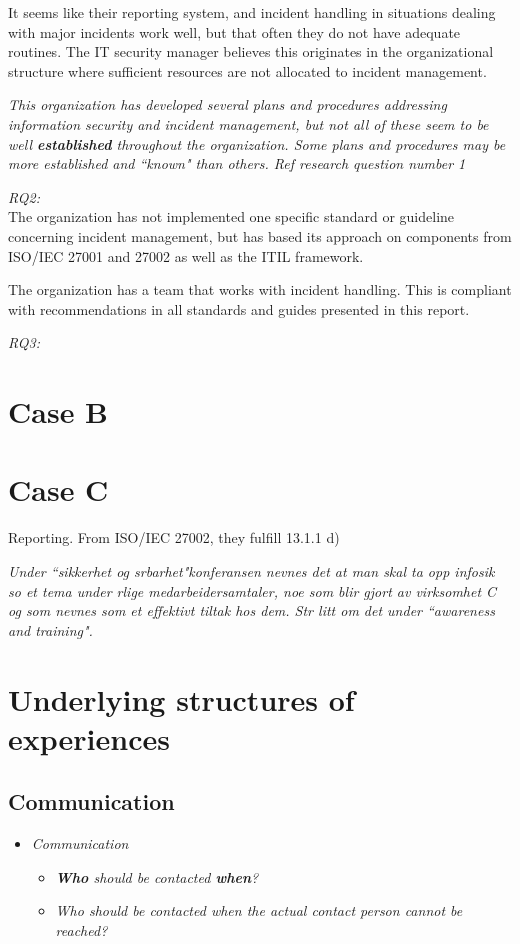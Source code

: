 It seems like their reporting system, and incident handling in situations dealing with major incidents work well, but that often they do not have adequate routines. The IT security manager believes this originates in the organizational structure where sufficient resources are not allocated to incident management. 

\textit{This organization has developed several plans and procedures addressing information security and incident management, but not all of these seem to be well \textbf{established} throughout the organization. Some plans and procedures may be more established and ``known" than others. Ref research question number 1}

\textit{RQ2:}\\
The organization has not implemented one specific standard or guideline concerning incident management, but has based its approach on components from ISO/IEC 27001 and 27002 as well as the \ac{ITIL} framework. 

The organization has a team that works with incident handling. This is compliant with recommendations in all standards and guides presented in this report.

\textit{RQ3:}\\

\section{Case B}

\section{Case C}

Reporting. From ISO/IEC 27002, they fulfill 13.1.1 d)

\textit{Under ``sikkerhet og srbarhet"konferansen nevnes det at man skal ta opp infosik so et tema under rlige medarbeidersamtaler, noe som blir gjort av virksomhet C og som nevnes som et effektivt tiltak hos dem. Str litt om det under ``awareness and training".}

\section{Underlying structures of experiences}
\subsection{Communication}
\begin{itemize}
\item \textit{Communication}
\begin{itemize}
\item \textit{\textbf{Who} should be contacted \textbf{when}?}
\item \textit{Who should be contacted when the actual contact person cannot be reached?}
\end{itemize}
\end{itemize}

